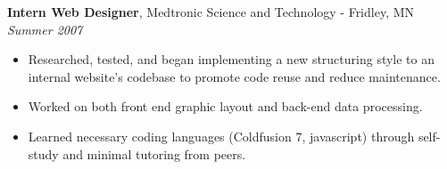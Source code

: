 {\bf Intern Web Designer}, Medtronic Science and Technology - Fridley, MN\\
{\it Summer 2007}
\begin{itemize}
	\item Researched, tested, and began implementing a new structuring style to an internal website’s codebase to promote code reuse and reduce maintenance.
	\item Worked on both front end graphic layout and back-end data processing.
	\item Learned necessary coding languages (Coldfusion 7, javascript) through self-study and minimal tutoring from peers.
\end{itemize}